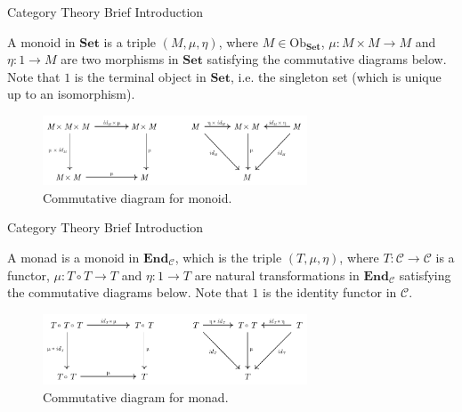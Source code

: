 \documentclass[aspectratio=169,xcolor=dvipsnames,10pt]{beamer}
\theoremstyle{definition}
\begin{document}
\begin{frame}[fragile]{Category Theory Brief Introduction}
	\begin{definition}
		A monoid in $\mathbf{Set}$ is a triple $(M, \mu, \eta)$, where $M \in \text{Ob}_\mathbf{Set}$,
		$\mu:M \times M \to M$ and $\eta: 1 \to M$ are two morphisms in $\mathbf{Set}$ satisfying the
		commutative diagrams below. Note that $1$ is the terminal object in $\mathbf{Set}$, i.e.
		the singleton set (which is unique up to an isomorphism).

		\begin{figure}[H]
			\begin{center}
				\includegraphics[width=0.7\textwidth]{./figs/MonoidalCategory.pdf}
			\end{center}
			\caption{Commutative diagram for monoid.}
			\label{fig:monoid-diagram}
		\end{figure}
		\label{def:monoid-cat}
	\end{definition}
\end{frame}

\begin{frame}[fragile]{Category Theory Brief Introduction}
	\begin{definition}[Monad]
		A monad is a monoid in $\mathbf{End}_\mathcal C$, which is the triple $(T, \mu, \eta)$,
		where $T:\mathcal C \to \mathcal C$ is a functor,
		$\mu:T \circ T \to T$ and $\eta: 1 \to T$ are natural transformations in $\mathbf{End}_\mathcal C$ satisfying the
		commutative diagrams below. Note that $1$ is the identity functor in $\mathcal{C}$.
		\begin{figure}[H]
			\begin{center}
				\includegraphics[width=0.7\textwidth]{../notebooks/Monad.pdf}
			\end{center}
			\caption{Commutative diagram for monad.}
			\label{fig:monad}
		\end{figure}
	\end{definition}
\end{frame}
\end{document}
